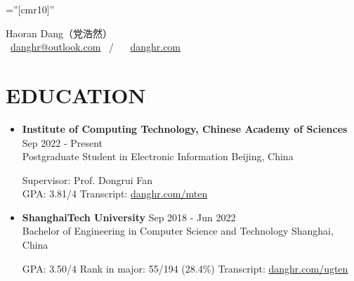\documentclass[a4paper,10pt]{ctexart} %
\begin{document}
\pagestyle{empty} %

\font\fb=''[cmr10]'' %



\begin{center}
    {\LARGE Haoran Dang}（党浩然） \\
     \  \href{mailto:danghr@outlook.com}{danghr@outlook.com} \  / \   \  \href{https://www.danghr.com}{danghr.com} \\
\end{center}



\section{EDUCATION}

    \begin{itemize}
        \item \textbf{Institute of Computing Technology, Chinese Academy of Sciences} \hfill Sep 2022 - Present \\
        Postgraduate Student in Electronic Information \hfill Beijing, China \\
        \begin{small}
            Supervisor: Prof. Dongrui Fan \\
            GPA: 3.81/4 \quad
            Transcript: \href{https://www.danghr.com/mten}{danghr.com/mten}
        \end{small}
        \item \textbf{ShanghaiTech University} \hfill Sep 2018 - Jun 2022\\
        Bachelor of Engineering in Computer Science and Technology \hfill Shanghai, China \\
        \begin{small}
            GPA: 3.50/4 \quad Rank in major: 55/194 (28.4\%) \quad
            Transcript: \href{https://www.danghr.com/ugten}{danghr.com/ugten}
        \end{small}
    \end{itemize}
\end{document}
